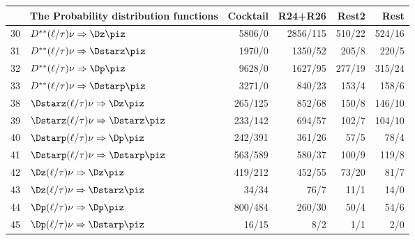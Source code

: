 \documentclass[6pt]{article}
\begin{document}
\begin{tabular}{r l r r r r}\\ \hline\hline
     & \multicolumn{1}{c}{\bf The Probability distribution functions}  &  Cocktail & R24+R26 & Rest2 & Rest  \\ \hline
30   & $D^{**}(\ell/\tau)\nu\Rightarrow\Dz\piz$               & 5806/0	    & 2856/115    & 510/22	& 524/16        \\
31   & $D^{**}(\ell/\tau)\nu\Rightarrow\Dstarz\piz$           & 1970/0	    & 1350/52	  & 205/8	& 220/5         \\
32   & $D^{**}(\ell/\tau)\nu\Rightarrow\Dp\piz$               & 9628/0	    & 1627/95	  & 277/19	& 315/24        \\
33   & $D^{**}(\ell/\tau)\nu\Rightarrow\Dstarp\piz$           & 3271/0	    & 840/23	  & 153/4	& 158/6         \\
38   & $\Dstarz(\ell/\tau)\nu\Rightarrow\Dz\piz$              & 265/125	    & 852/68	  & 150/8	& 146/10        \\
39   & $\Dstarz(\ell/\tau)\nu\Rightarrow\Dstarz\piz$          & 233/142	    & 694/57	  & 102/7	& 104/10        \\
40   & $\Dstarp(\ell/\tau)\nu\Rightarrow\Dp\piz$              & 242/391	    & 361/26	  & 57/5	& 78/4          \\
41   & $\Dstarp(\ell/\tau)\nu\Rightarrow\Dstarp\piz$          & 563/589	    & 580/37	  & 100/9	& 119/8         \\
42   & $\Dz(\ell/\tau)\nu\Rightarrow\Dz\piz$                  & 419/212	    & 452/55	  & 73/20	& 81/7          \\
43   & $\Dz(\ell/\tau)\nu\Rightarrow\Dstarz\piz$              & 34/34	    & 76/7	  & 11/1	& 14/0          \\
44   & $\Dp(\ell/\tau)\nu\Rightarrow\Dp\piz$                  & 800/484	    & 260/30	  & 50/4	& 54/6          \\
45   & $\Dp(\ell/\tau)\nu\Rightarrow\Dstarp\piz$              & 16/15       & 8/2         & 1/1         & 2/0           \\\hline 
\hline \hline 
\end{tabular}
\end{document}
